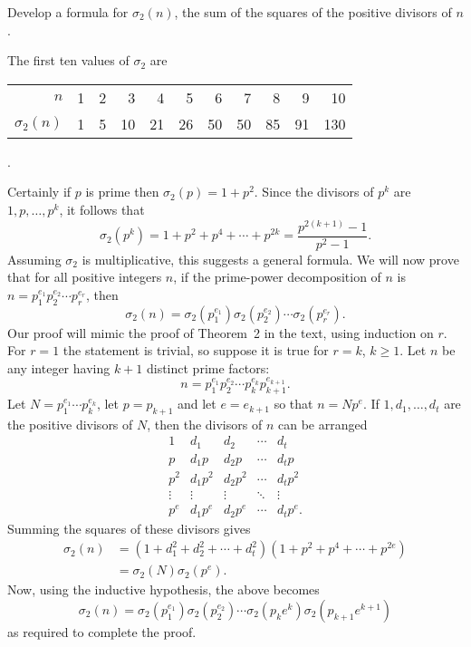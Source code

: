  Develop a formula for $\sigma_2(n)$, the sum of the
squares of the positive divisors of $n$.
\begin{solution}
  The first ten values of $\sigma_2$ are
  \begin{center}
    \begin{tabular}{r|rrrrrrrrrr}
      $n$ & 1 & 2 & 3 & 4 & 5 & 6 & 7 & 8 & 9 & 10 \\
      $\sigma_2(n)$ & 1 & 5 & 10 & 21 & 26 & 50 & 50 & 85 & 91 & 130
    \end{tabular}.
  \end{center}
  Certainly if $p$ is prime then $\sigma_2(p) = 1 + p^2$. Since the
  divisors of $p^k$ are $1, p, \dots, p^k$, it follows that
  \begin{equation*}
    \sigma_2(p^k) = 1 + p^2 + p^4 + \cdots + p^{2k}
    = \frac{p^{2(k+1)} - 1}{p^2 - 1}.
  \end{equation*}
  Assuming $\sigma_2$ is multiplicative, this suggests a general
  formula. We will now prove that for all positive integers $n$, if
  the prime-power decomposition of $n$ is
  $n = p_1^{e_1}p_2^{e_2}\cdots p_r^{e_r}$, then
  \begin{equation*}
    \sigma_2(n)
    = \sigma_2(p_1^{e_1})\sigma_2(p_2^{e_2})\cdots\sigma_2(p_r^{e_r}).
  \end{equation*}
  Our proof will mimic the proof of Theorem~2 in the text, using
  induction on $r$. For $r = 1$ the statement is trivial, so suppose
  it is true for $r = k$, $k\geq1$. Let $n$ be any integer having
  $k+1$ distinct prime factors:
  \begin{equation*}
    n = p_1^{e_1}p_2^{e_2}\cdots p_k^{e_k}p_{k+1}^{e_{k+1}}.
  \end{equation*}
  Let $N = p_1^{e_1}\cdots p_k^{e_k}$, let $p = p_{k+1}$ and let
  $e = e_{k+1}$ so that $n = Np^e$. If $1, d_1, \dots, d_t$ are the
  positive divisors of $N$, then the divisors of $n$ can be arranged
  \begin{equation*}
    \begin{matrix}
      1 & d_1 & d_2 & \cdots & d_t \\
      p & d_1p & d_2p & \cdots & d_tp \\
      p^2 & d_1p^2 & d_2p^2 & \cdots & d_tp^2 \\
      \vdots & \vdots & \vdots & \ddots & \vdots \\
      p^e & d_1p^e & d_2p^e & \cdots & d_tp^e.
    \end{matrix}
  \end{equation*}
  Summing the squares of these divisors gives
  \begin{align*}
    \sigma_2(n) &= (1 + d_1^2 + d_2^2 + \cdots + d_t^2)
                  (1 + p^2 + p^4 + \cdots + p^{2e}) \\
                &= \sigma_2(N)\sigma_2(p^e).
  \end{align*}
  Now, using the inductive hypothesis, the above becomes
  \begin{equation*}
    \sigma_2(n)
    = \sigma_2(p_1^{e_1})\sigma_2(p_2^{e_2})
    \cdots\sigma_2(p_ke^k)\sigma_2(p_{k+1}e^{k+1})
  \end{equation*}
  as required to complete the proof.
\end{solution}

